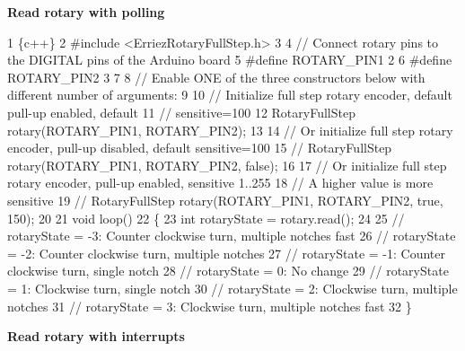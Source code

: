 {\bfseries Read rotary with polling} 
\begin{DoxyCode}
1 \{c++\}
2 #include <ErriezRotaryFullStep.h>
3 
4 // Connect rotary pins to the DIGITAL pins of the Arduino board
5 #define ROTARY\_PIN1   2
6 #define ROTARY\_PIN2   3
7 
8 // Enable ONE of the three constructors below with different number of arguments:
9 
10 // Initialize full step rotary encoder, default pull-up enabled, default 
11 // sensitive=100
12 RotaryFullStep rotary(ROTARY\_PIN1, ROTARY\_PIN2);
13 
14 // Or initialize full step rotary encoder, pull-up disabled, default sensitive=100
15 // RotaryFullStep rotary(ROTARY\_PIN1, ROTARY\_PIN2, false);
16 
17 // Or initialize full step rotary encoder, pull-up enabled, sensitive 1..255
18 // A higher value is more sensitive
19 // RotaryFullStep rotary(ROTARY\_PIN1, ROTARY\_PIN2, true, 150);
20 
21 void loop()
22 \{
23   int rotaryState = rotary.read();
24 
25   // rotaryState = -3: Counter clockwise turn, multiple notches fast
26   // rotaryState = -2: Counter clockwise turn, multiple notches
27   // rotaryState = -1: Counter clockwise turn, single notch
28   // rotaryState = 0:  No change
29   // rotaryState = 1:  Clockwise turn, single notch
30   // rotaryState = 2:  Clockwise turn, multiple notches
31   // rotaryState = 3:  Clockwise turn, multiple notches fast
32 \}
\end{DoxyCode}


{\bfseries Read rotary with interrupts}


